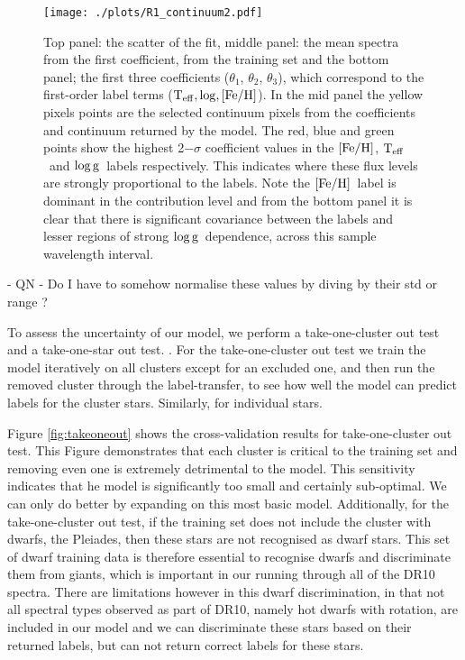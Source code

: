 \documentclass[12pt, preprint]{aastex}
\newcommand{\teff}{\mbox{$\rm T_{eff}$}}
\newcommand{\feh}{\mbox{$\rm [Fe/H]$}}
\newcommand{\logg}{\mbox{$\rm \log g$}}
\begin{document}
 
\begin{figure}[h!]
    \texttt{[image: ./plots/R1\_continuum2.pdf]}
  \caption{Top panel: the scatter of the fit, middle panel: the mean spectra from the first coefficient, from the training set and the bottom panel; the first three coefficients ($\theta_1$, $\theta_2$, $\theta_3$),  which correspond to the first-order label terms ($\teff, \log, \feh$). In the mid panel the yellow pixels points are the selected continuum pixels from the coefficients and continuum returned by the model.  The red, blue and green points show the highest 2$-\sigma$ coefficient values in the \feh, \teff\ and \logg\ labels respectively. This indicates where these flux levels are strongly proportional to the labels. Note the \feh\ label is dominant in the contribution level and from the bottom panel it is clear that there is significant covariance between the labels and lesser regions of strong \logg\ dependence, across this sample wavelength interval.}
\label{fig:coeffs}
\end{figure}
- QN  - Do I have to somehow normalise these values by diving by their std or range ? 


To assess the uncertainty of our model, we perform a take-one-cluster out test and a take-one-star out test. . For the take-one-cluster out test we train the model iteratively on all clusters except for an excluded one, and then run the removed cluster through the label-transfer, to see how well the model can predict labels for the cluster stars. Similarly, for individual stars.  

Figure \ref{fig:takeoneout} shows the cross-validation results for take-one-cluster out test. This Figure demonstrates that each cluster is critical to the training set and removing even one is extremely detrimental to the model. This sensitivity indicates that he model is significantly too small and certainly sub-optimal. We can only do better by expanding on this most basic model. Additionally, for the take-one-cluster out test, if the training set does not include the cluster with dwarfs, the Pleiades, then these stars are not recognised as dwarf stars. This set of dwarf training data is therefore essential to recognise dwarfs and discriminate them from giants, which is important in our running through all of the DR10 spectra. There are limitations however in this dwarf discrimination, in that not all spectral types observed as part of DR10, namely hot dwarfs with rotation, are included in our model and we can discriminate these stars based on their returned labels, but can not return correct labels for these stars. 
\end{document}
